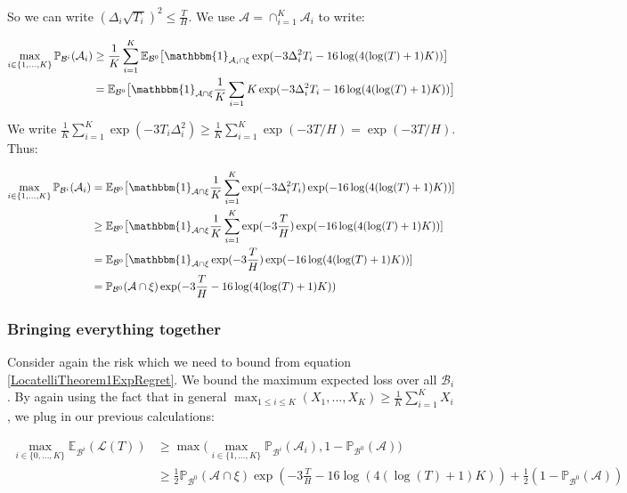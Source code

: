 \documentclass[12pt,]{article}
\begin{document}
So we can write \((\Delta_i \sqrt{T_i})^2 \leq \frac{T}{H}\). We use
\(\mathcal{A} = \cap_{i=1}^K \mathcal{A}_i\) to write:

\begin{align*}
\max_{i \in \{1,\dots,K\}} \mathbb{P}_{\mathcal{B}^i}(\mathcal{A}_i) & \geq \frac{1}{K} \sum_{i=1}^{K} \mathbb{E}_{\mathcal{B}^0} \big[\mathbbm{1}_{\mathcal{A}_i \cap \xi} \exp (- 3 \Delta_i^2 T_i - 16 \log(4(\log(T)+1)K)) \big] \\
& = \mathbb{E}_{\mathcal{B}^0} \big[\mathbbm{1}_{\mathcal{A} \cap \xi} \frac{1}{K} \sum_{i=1}{K} \exp (- 3 \Delta_i^2 T_i - 16 \log(4(\log(T)+1)K)) \big]
\end{align*}

We write
\(\frac{1}{K} \sum_{i=1}^K \exp(-3T_i \Delta_i^2) \geq \frac{1}{K} \sum_{i=1}^K \exp(-3 T/H) = \exp(-3 T/H)\).
Thus:

\begin{align*}
\max_{i \in \{1,\dots,K\}} \mathbb{P}_{\mathcal{B}^i}(\mathcal{A}_i) & = \mathbb{E}_{\mathcal{B}^0} \big[\mathbbm{1}_{\mathcal{A} \cap \xi} \frac{1}{K} \sum_{i=1}^{K} \exp (- 3 \Delta_i^2 T_i) \exp(-16 \log(4(\log(T)+1)K)) ] \\
& \geq \mathbb{E}_{\mathcal{B}^0} \big[\mathbbm{1}_{\mathcal{A} \cap \xi} \frac{1}{K} \sum_{i=1}^{K} \exp (- 3 \frac{T}{H}) \exp(-16 \log(4(\log(T)+1)K)) ] \\
& = \mathbb{E}_{\mathcal{B}^0} \big[\mathbbm{1}_{\mathcal{A} \cap \xi} \exp (- 3 \frac{T}{H}) \exp(-16 \log(4(\log(T)+1)K)) ] \\
& = \mathbb{P}_{\mathcal{B}^0} (\mathcal{A} \cap \xi) \exp (- 3 \frac{T}{H} -16 \log(4(\log(T)+1)K))
\end{align*}

\subsubsection{Bringing everything
together}\label{bringing-everything-together}

Consider again the risk which we need to bound from equation
\eqref{LocatelliTheorem1ExpRegret}. We bound the maximum expected loss
over all \(\mathcal{B}_i\). By again using the fact that in general
\(\max_{1 \leq i \leq K} (X_1, \dots, X_K) \geq \frac{1}{K} \sum_{i = 1}^K X_i\),
we plug in our previous calculations:

\begin{align}
\max_{i \in \{0, \dots, K\}} \mathbb{E}_{\mathcal{B}^i} (\mathcal{L}(T)) & \geq \max \big( \max_{i \in \{1, \dots, K\}} \mathbb{P}_{\mathcal{B}^i}(\mathcal{A}_i), 1 - \mathbb{P}_{\mathcal{B}^0}(\mathcal{A}) \big) \\
& \geq \frac{1}{2}\mathbb{P}_{\mathcal{B}^0} (\mathcal{A} \cap \xi) \exp (- 3 \frac{T}{H} -16 \log(4(\log(T)+1)K)) + \frac{1}{2}(1 - \mathbb{P}_{\mathcal{B}^0}(\mathcal{A})) \label{LocatelliTheorem1DefinitionOfRisk}
\end{align}
\end{document}
